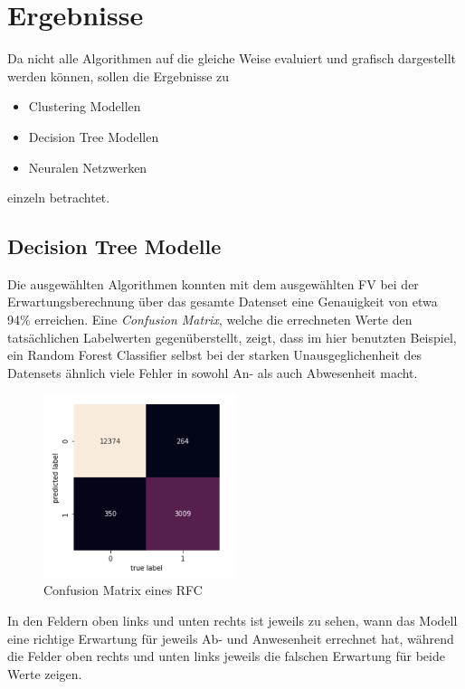 \newpage
\section{Ergebnisse}
Da nicht alle Algorithmen auf die gleiche Weise evaluiert und grafisch dargestellt werden können, sollen 
die Ergebnisse zu 
\begin{itemize}
    \item Clustering Modellen
    \item Decision Tree Modellen
    \item Neuralen Netzwerken
\end{itemize}
einzeln betrachtet.

\subsection{Decision Tree Modelle}
Die ausgewählten Algorithmen konnten mit dem ausgewählten FV bei der Erwartungsberechnung über das gesamte 
Datenset eine Genauigkeit von etwa 94\% erreichen. Eine \textit{Confusion Matrix}, welche die errechneten 
Werte den tatsächlichen Labelwerten gegenüberstellt, zeigt, dass im hier benutzten Beispiel, ein Random Forest Classifier 
selbst bei der starken Unausgeglichenheit des Datensets ähnlich viele Fehler in sowohl An- als auch Abwesenheit 
macht.

\begin{figure}[h]
    \centering
    \includegraphics[width=0.5\textwidth]{pic/confusion_matrix.png}
    \caption{Confusion Matrix eines RFC}
    \label{fig:ConMatrix}
\end{figure}

In den Feldern oben links und unten rechts ist jeweils zu sehen, wann das Modell eine richtige Erwartung 
für jeweils Ab- und Anwesenheit errechnet hat, während die Felder oben rechts und unten links jeweils die falschen
Erwartung für beide Werte zeigen.\\\\

